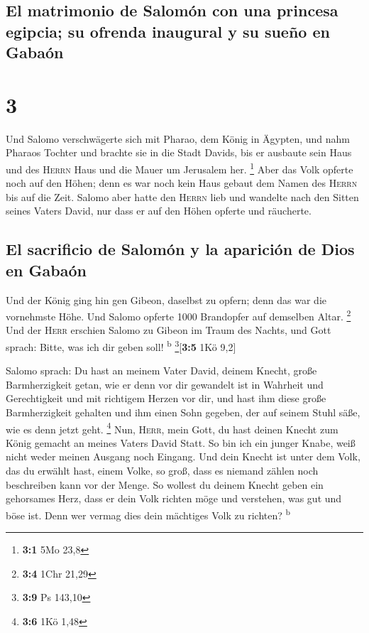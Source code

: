 \hypertarget{el-matrimonio-de-salomuxf3n-con-una-princesa-egipcia-su-ofrenda-inaugural-y-su-sueuxf1o-en-gabauxf3n}{%
\subsection{El matrimonio de Salomón con una princesa egipcia; su
ofrenda inaugural y su sueño en
Gabaón}\label{el-matrimonio-de-salomuxf3n-con-una-princesa-egipcia-su-ofrenda-inaugural-y-su-sueuxf1o-en-gabauxf3n}}

\hypertarget{section-2}{%
\section{3}\label{section-2}}

 Und Salomo verschwägerte sich mit Pharao, dem König in
Ägypten, und nahm Pharaos Tochter und brachte sie in die Stadt Davids,
bis er ausbaute sein Haus und des \textsc{Herrn} Haus und die Mauer um
Jerusalem her. \footnote{\textbf{3:1} 5Mo 23,8}  Aber das
Volk opferte noch auf den Höhen; denn es war noch kein Haus gebaut dem
Namen des \textsc{Herrn} bis auf die Zeit.  Salomo aber
hatte den \textsc{Herrn} lieb und wandelte nach den Sitten seines Vaters
David, nur dass er auf den Höhen opferte und räucherte.

\hypertarget{el-sacrificio-de-salomuxf3n-y-la-apariciuxf3n-de-dios-en-gabauxf3n}{%
\subsection{El sacrificio de Salomón y la aparición de Dios en
Gabaón}\label{el-sacrificio-de-salomuxf3n-y-la-apariciuxf3n-de-dios-en-gabauxf3n}}

 Und der König ging hin gen Gibeon, daselbst zu opfern;
denn das war die vornehmste Höhe. Und Salomo opferte 1000 Brandopfer auf
demselben Altar. \footnote{\textbf{3:4} 1Chr 21,29}  Und
der \textsc{Herr} erschien Salomo zu Gibeon im Traum des Nachts, und
Gott sprach: Bitte, was ich dir geben soll! \textsuperscript{b}
\footnote{\textbf{3:9} Ps 143,10}{[}\textbf{3:5} 1Kö 9,2{]}

 Salomo sprach: Du hast an meinem Vater David, deinem
Knecht, große Barmherzigkeit getan, wie er denn vor dir gewandelt ist in
Wahrheit und Gerechtigkeit und mit richtigem Herzen vor dir, und hast
ihm diese große Barmherzigkeit gehalten und ihm einen Sohn gegeben, der
auf seinem Stuhl säße, wie es denn jetzt geht. \footnote{\textbf{3:6}
  1Kö 1,48}  Nun, \textsc{Herr}, mein Gott, du hast deinen
Knecht zum König gemacht an meines Vaters David Statt. So bin ich ein
junger Knabe, weiß nicht weder meinen Ausgang noch Eingang.
 Und dein Knecht ist unter dem Volk, das du erwählt hast,
einem Volke, so groß, dass es niemand zählen noch beschreiben kann vor
der Menge.  So wollest du deinem Knecht geben ein
gehorsames Herz, dass er dein Volk richten möge und verstehen, was gut
und böse ist. Denn wer vermag dies dein mächtiges Volk zu richten?
\textsuperscript{b}

